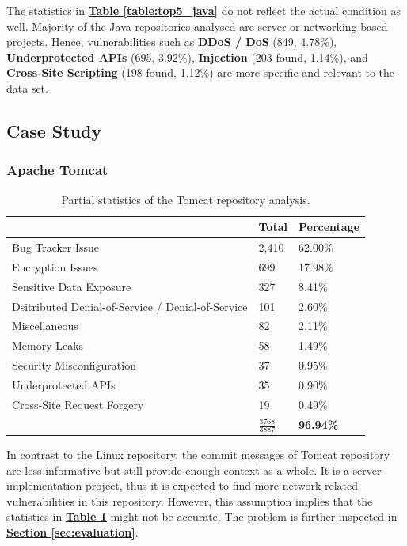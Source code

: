 \documentclass[12pt, a4paper]{report}
\begin{document}
The statistics in \hyperref[table:top5_java]{\textbf{Table \ref*{table:top5_java}}} do not reflect
the actual condition as well. Majority of the Java repositories analysed are server or networking
based projects. Hence, vulnerabilities such as \textbf{DDoS / DoS} (849, 4.78\%),
\textbf{Underprotected APIs} (695, 3.92\%), \textbf{Injection} (203 found, 1.14\%), and
\textbf{Cross-Site Scripting} (198 found, 1.12\%) are more specific and relevant to the data set.

\subsection{Case Study}
\subsubsection*{Apache Tomcat}
\begin{table}[H]
  \centering
  \begin{tabular}{|l|l|l|}
    \hline \rowcolor[HTML]{D8D8D8}
    \multicolumn{1}{|c|}{Vulnerabilities} & \multicolumn{1}{|c|}{Total} &
    \multicolumn{1}{|c|}{Percentage} \\ \hline
    Bug Tracker Issue & 2,410 & 62.00\% \\
    Encryption Issues & 699 & 17.98\% \\
    Sensitive Data Exposure & 327 & 8.41\% \\
    Dsitributed Denial-of-Service / Denial-of-Service & 101 & 2.60\% \\
    Miscellaneous & 82 & 2.11\% \\
    Memory Leaks & 58 & 1.49\% \\
    Security Misconfiguration & 37 & 0.95\% \\
    Underprotected APIs & 35 & 0.90\% \\
    Cross-Site Request Forgery & 19 & 0.49\% \\ \hline
    & \textbf{$\frac{3768}{3887}$} & \textbf{96.94\%} \\ \hline
  \end{tabular}
  \caption{Partial statistics of the Tomcat repository analysis.}
  \label{table:case_tomcat}
\end{table}

In contrast to the Linux repository, the commit messages of Tomcat repository
\cite{apache_tomcat_repo} are less informative but still provide enough context as a whole. It is a
server implementation project, thus it is expected to find more network related vulnerabilities in
this repository. However, this assumption implies that the statistics in
\hyperref[table:case_tomcat]{\textbf{Table \ref*{table:case_tomcat}}} might not be accurate. The
problem is further inspected in \hyperref[sec:evaluation]{\textbf{Section \ref*{sec:evaluation}}}.
\end{document}
